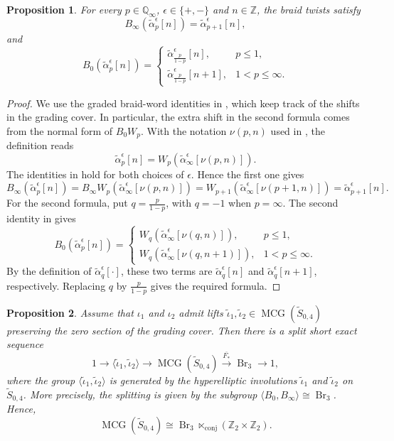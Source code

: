 \documentclass[11pt,a4paper,reqno]{amsart}%
\theoremstyle{plain}
\newtheorem{proposition}[proposition]{Proposition}
\theoremstyle{definition}
\numberwithin{equation}{section}
\numberwithin{equation}{section}
\def\ZZ{\mathbb{Z}}
\newcommand{\QQi}{\mathbb{Q}_\infty}
\newcommand{\MCG}{\operatorname{MCG}}
\def\Br{\operatorname{Br}}
\begin{document}
\begin{proposition}\label{prop:braid-twist-slope-action}
For every $p\in\QQi$, $\epsilon\in\{+,-\}$ and $n\in\ZZ$, the braid twists satisfy
\[
 B_\infty(\widetilde{\alpha}_p^\epsilon[n])
 =\widetilde{\alpha}_{p+1}^\epsilon[n],
\]
and
\[
 B_0(\widetilde{\alpha}_p^\epsilon[n])
 =
\begin{cases}
\widetilde{\alpha}_{\frac{p}{1-p}}^\epsilon[n],& p\le 1,\\[4pt]
\widetilde{\alpha}_{\frac{p}{1-p}}^\epsilon[n+1],& 1<p\le\infty.
\end{cases}
\]
\end{proposition}
\begin{proof}
  We use the graded braid-word identities in , which keep track of the shifts in the grading cover. In particular, the extra shift in the second formula comes from the normal form of $B_0W_p$.
With the notation $\nu(p,n)$ used in , the definition reads
\[
\widetilde{\alpha}_p^\epsilon[n]=W_p(\widetilde{\alpha}_\infty^\epsilon[\nu(p,n)]).
\]
The identities in  hold for both choices of
$\epsilon$. Hence the first one gives
\[
B_\infty(\widetilde{\alpha}_p^\epsilon[n])
=B_\infty W_p(\widetilde{\alpha}_\infty^\epsilon[\nu(p,n)])
=W_{p+1}(\widetilde{\alpha}_\infty^\epsilon[\nu(p+1,n)])
=\widetilde{\alpha}_{p+1}^\epsilon[n].
\]
For the second formula, put $q=\frac{p}{1-p}$, with $q=-1$ when $p=\infty$.
The second identity in  gives
\[
B_0(\widetilde{\alpha}_p^\epsilon[n])
=
\begin{cases}
W_q(\widetilde{\alpha}_\infty^\epsilon[\nu(q,n)]),& p\le 1,\\[4pt]
W_q(\widetilde{\alpha}_\infty^\epsilon[\nu(q,n+1)]),& 1<p\le\infty.
\end{cases}
\]
By the definition of $\widetilde{\alpha}_q^\epsilon[\cdot]$, these two terms are
$\widetilde{\alpha}_q^\epsilon[n]$ and $\widetilde{\alpha}_q^\epsilon[n+1]$,
respectively. Replacing $q$ by $\frac{p}{1-p}$ gives the required formula.
\end{proof}

\begin{proposition}\label{prop:mcgS42}
Assume that $\iota_1$ and $\iota_2$ admit lifts
$\tilde\iota_1,\tilde\iota_2\in \MCG(\widetilde{S}_{0,4})$ preserving the zero section of the grading cover. Then there is a split short exact sequence
\begin{equation}\label{eq:ses-mcgS42}
1\longrightarrow\langle\tilde\iota_1,\tilde\iota_2\rangle
\longrightarrow \MCG(\widetilde{S}_{0,4})
\xrightarrow{\overline{F_*}} \Br_3\longrightarrow 1,
\end{equation}
where the group  $\langle\tilde\iota_1,\tilde\iota_2\rangle$ is generated by the hyperelliptic involutions $\tilde\iota_1$  and $\tilde\iota_2$ on $\widetilde{S}_{0,4}$.
More precisely, the splitting is given by the subgroup
$\langle B_0,B_\infty\rangle\cong\Br_3$. Hence,
\[
\MCG(\widetilde{S}_{0,4})\cong \Br_3\ltimes_{\operatorname{conj}}(\ZZ_2\times \ZZ_2).
\]
\end{proposition}
\end{document}
